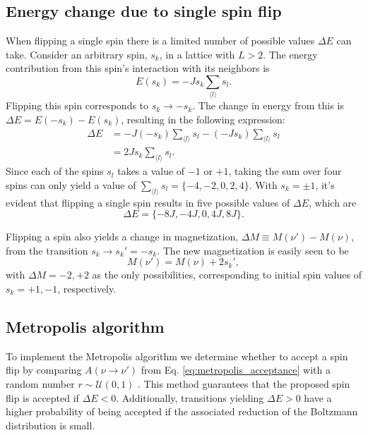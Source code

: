 \subsection{Energy change due to single spin flip}\label{subsec_implementations:de_from_single_flip}
When flipping a single spin there is a limited number of possible values $\Delta E$ can take. Consider an arbitrary spin, $s_k$, in a lattice with $L>2$. The energy contribution from this spin's interaction with its neighbors is 
\begin{equation}\label{eq:single_spin_energy}
    E(s_k) = -J s_k \sum_{\langle l \rangle} s_l.
\end{equation}   
Flipping this spin corresponds to $s_k\to -s_k$. The change in energy from this is $\Delta E=E(-s_k)-E(s_k)$, resulting in the following expression:
\begin{align}
        \Delta E &= -J(-s_k) \sum_{\langle l \rangle} s_l - (-J s_k) \sum_{\langle l \rangle} s_l \nonumber \\ 
        &= 2Js_k \sum_{\langle l \rangle} s_l. \label{eq:DeltaE_from_single_spin_flip}
\end{align}
Since each of the spins $s_l$ takes a value of $-1$ or $+1$, taking the sum over four spins can only yield a value of $\sum_{\langle l \rangle}s_l=\{-4,-2,0,2,4\}$. With $s_k=\pm1$, it's evident that flipping a single spin results in five possible values of $\Delta E$, which are 
\begin{equation}\label{eq:DeltaE_possible_values}
    \Delta E = \{-8J,-4J,0,4J,8J\}. 
\end{equation}  


Flipping a spin also yields a change in magnetization, $\Delta M\equiv M(\nu')-M(\nu)$, from the transition $s_k\to s_k'=-s_k$. The new magnetization is easily seen to be 
\begin{equation} \label{eq:magnetization_from_single_flip}
    M(\nu') = M(\nu) + 2 s_k',
\end{equation} 
with $\Delta M={-2,+2}$ as the only possibilities, corresponding to initial spin values of $s_k={+1,-1}$, respectively.   

\subsection{Metropolis algorithm}\label{subsec_implementations:metropolis}
To implement the Metropolis algorithm we determine whether to accept a spin flip by comparing $A(\nu\to\nu')$ from Eq. \eqref{eq:metropolis_acceptance} with a random number $r\sim \mathcal{U}(0,1)$ . This method guarantees that the proposed spin flip is accepted if $\Delta E<0$. Additionally, transitions yielding $\Delta E>0$ have a higher probability of being accepted if the associated reduction of the Boltzmann distribution is small. 

